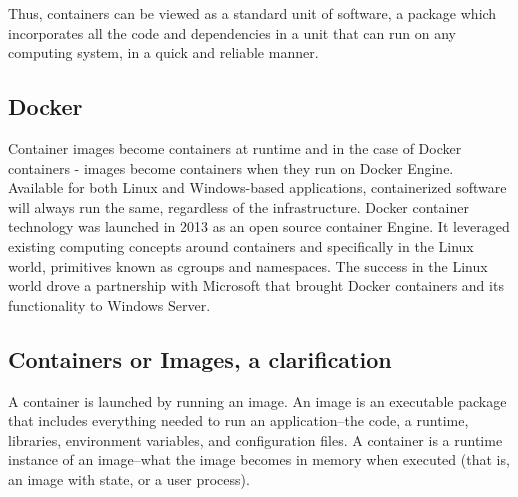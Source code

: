 Thus, containers can be viewed as a standard unit of software, a package which incorporates all the code and dependencies in a unit that can run on any computing system, in a quick and reliable manner.

\subsection{Docker}
Container images become containers at runtime and in the case of Docker containers - images become containers when they run on Docker Engine. Available for both Linux and Windows-based applications, containerized software will always run the same, regardless of the infrastructure. Docker container technology\cite{docker} was launched in 2013 as an open source container Engine. It leveraged existing computing concepts around containers and specifically in the Linux world, primitives known as cgroups and namespaces. The success in the Linux world drove a partnership with Microsoft that brought Docker containers and its functionality to Windows Server.

\subsection{Containers or Images, a clarification}
A container is launched by running an image. An image is an executable package that includes everything needed to run an application--the code, a runtime, libraries, environment variables, and configuration files. A container is a runtime instance of an image--what the image becomes in memory when executed (that is, an image with state, or a user process).

